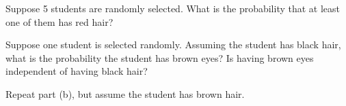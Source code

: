 \documentclass{article}
\begin{document}
\begin{flushleft}
\begin{enumalpha}
\item Suppose 5 students are randomly selected. What is the probability that at least one of them has red hair?
\vspace{2.25in}
\item Suppose one student is selected randomly. Assuming the student has black hair, what is the probability the student has brown eyes? Is having brown eyes independent of having black hair?
\vspace{2.25in}
\item Repeat part (b), but assume the student has brown hair.

\end{enumalpha}


\end{flushleft}
\end{document}
